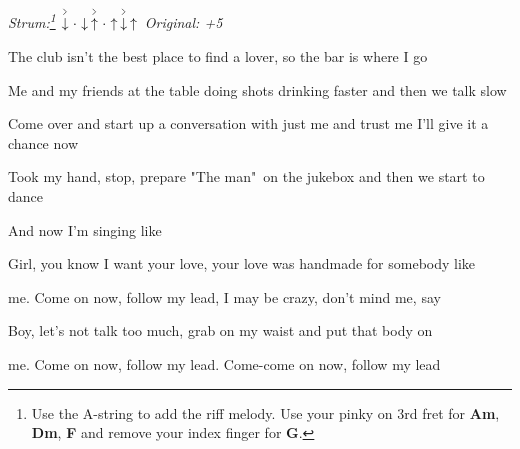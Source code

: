 \begin{song}


\textit{Strum:\footnote{
Use the A-string to add the riff melody. Use your pinky on 3rd fret for
\textbf{Am}, \textbf{Dm}, \textbf{F} and remove your index finger for \textbf{G}.
}} $\AccentDown\Miss\Down\AccentUp\Miss\Up\AccentDown\Up$ \quad
\textit{Original: +5} \par

\large


\normalsize

\bigskip

The club isn't the best place to find a lover, so the bar is where I go \par
{}Me and my friends at the table doing shots drinking faster and then we talk slow \par
Come over and start up a conversation with just me and trust me I'll give it a chance now \par
Took my hand, stop, prepare "The man"\ on the jukebox and then we start to dance \par
And now I'm singing like \par

\bigskip

\begin{chorusbox}{\PrechorusAndChorus} \par
{}Girl, you know I want your love, your love was handmade for somebody like \par
{}me. Come on now, follow my lead, I may be crazy, don't mind me, say \par
{}Boy, let's not talk too much, grab on my waist and put that body on \par
{}me. Come on now, follow my lead. Come-come on now, follow my lead \par

\bigskip


\end{chorusbox}
\end{song}
